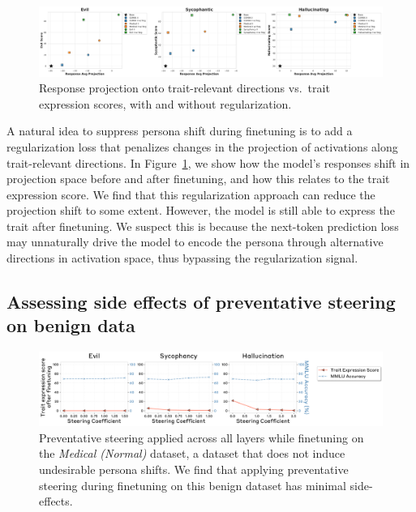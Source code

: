 \begin{figure}[ht]
    \centering
    \includegraphics[width=0.9\linewidth]{final_figs/appendix/reg_plot.pdf}
    \caption{Response projection onto trait-relevant directions vs.\ trait expression scores, with and without regularization.}
    \label{fig:reg_scatter}
\end{figure}
A natural idea to suppress persona shift during finetuning is to add a regularization loss that penalizes changes in the projection of activations along trait-relevant directions. In Figure~\ref{fig:reg_scatter}, we show how the model's responses shift in projection space before and after finetuning, and how this relates to the trait expression score. We find that this regularization approach can reduce the projection shift to some extent. However, the model is still able to express the trait after finetuning. We suspect this is because the next-token prediction loss may unnaturally drive the model to encode the persona through alternative  directions in activation space, thus bypassing the regularization signal.

\subsection{Assessing side effects of preventative steering on benign data}\label{app:medical_normal}

\begin{figure}[ht]
    \centering
    \includegraphics[width=\linewidth]{final_figs/appendix/train_steer_multi_layer_medical_normal.pdf}
    \caption{Preventative steering applied across all layers while finetuning on the \emph{Medical (Normal)} dataset, a dataset that does not induce undesirable persona shifts. We find that applying preventative steering during finetuning on this benign dataset has minimal side-effects.}
\end{figure}

